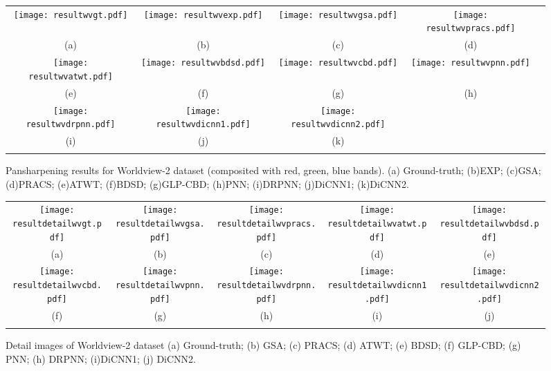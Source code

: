 \documentclass[journal]{IEEEtran}
\begin{document}
\begin{figure*}[t]\scriptsize
\centering
  \begin{tabular}{ccccc}
\texttt{[image: resultwvgt.pdf]} &
\texttt{[image: resultwvexp.pdf]} &
\texttt{[image: resultwvgsa.pdf]} &
\texttt{[image: resultwvpracs.pdf]} \\
(a) & (b) & (c) &(d) \\
\texttt{[image: resultwvatwt.pdf]} &
\texttt{[image: resultwvbdsd.pdf]} &
\texttt{[image: resultwvcbd.pdf]} &
\texttt{[image: resultwvpnn.pdf]} \\
(e) & (f) & (g) &(h)  \\
\texttt{[image: resultwvdrpnn.pdf]} &
\texttt{[image: resultwvdicnn1.pdf]} &
\texttt{[image: resultwvdicnn2.pdf]} \\
(i) &(j) & (k)  \\
\\
\end{tabular}
\caption{Pansharpening results for Worldview-2 dataset (composited with red, green, blue bands). (a) Ground-truth; (b)EXP; (c)GSA; (d)PRACS; (e)ATWT; (f)BDSD; (g)GLP-CBD; (h)PNN; (i)DRPNN; (j)DiCNN1; (k)DiCNN2.}
\label{figure:reducewv2}
\end{figure*}

\begin{figure*}[t]\scriptsize
\centering
\begin{tabular}{ccccc}
\texttt{[image: resultdetailwvgt.pdf]} &
\texttt{[image: resultdetailwvgsa.pdf]} &
\texttt{[image: resultdetailwvpracs.pdf]} &
\texttt{[image: resultdetailwvatwt.pdf]} &
\texttt{[image: resultdetailwvbdsd.pdf]} \\
(a) & (b) & (c) &(d) &(e)  \\
\texttt{[image: resultdetailwvcbd.pdf]} &
\texttt{[image: resultdetailwvpnn.pdf]} &
\texttt{[image: resultdetailwvdrpnn.pdf]} &
\texttt{[image: resultdetailwvdicnn1.pdf]} &
\texttt{[image: resultdetailwvdicnn2.pdf]} \\
(f) & (g) &(h) &(i) &(j) \\
\\
\end{tabular}
\caption{Detail images of Worldview-2 dataset (a) Ground-truth; (b) GSA; (c) PRACS; (d) ATWT; (e) BDSD; (f) GLP-CBD; (g) PNN; (h) DRPNN; (i)DiCNN1; (j) DiCNN2.}
\label{figure:detailimage:wv}
\end{figure*}
\end{document}
